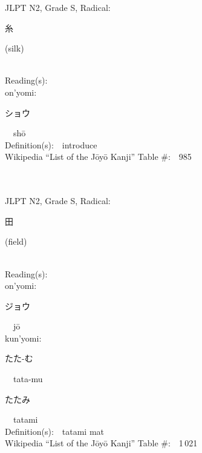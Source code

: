 \begin{multicols}{2}
{JLPT N2, Grade S, Radical:\ \ {\begin{CJK}{UTF8}{min} 糸 \end{CJK}} (silk) } \\
Reading(s):\ \ \\
{\hspace*{1em}}on'yomi:\ \ \\
{\hspace*{2em}}{\begin{CJK}{UTF8}{min} ショウ \end{CJK}}\ \ sh\=o\ \ \\
Definition(s):\ \ introduce \\
Wikipedia ``List of the J\=oy\=o Kanji'' Table \#:\ \ 985 \\
\ \ \\
{\fontsize{34pt}{40pt}  }\ \ \\  %
{JLPT N2, Grade S, Radical:\ \ {\begin{CJK}{UTF8}{min} 田 \end{CJK}} (field) } \\
Reading(s):\ \ \\
{\hspace*{1em}}on'yomi:\ \ \\
{\hspace*{2em}}{\begin{CJK}{UTF8}{min} ジョウ \end{CJK}}\ \ j\=o\ \ \\
{\hspace*{1em}}kun'yomi:\ \ \\
{\hspace*{2em}}{\begin{CJK}{UTF8}{min} たた-む \end{CJK}}\ \ tata-mu\ \ \\
{\hspace*{2em}}{\begin{CJK}{UTF8}{min} たたみ \end{CJK}}\ \ tatami\ \ \\
Definition(s):\ \ tatami mat \\
Wikipedia ``List of the J\=oy\=o Kanji'' Table \#:\ \ 1\,021 \\
\ \ \\
{\fontsize{34pt}{40pt}  }\ \ \\  %

\end{multicols}
